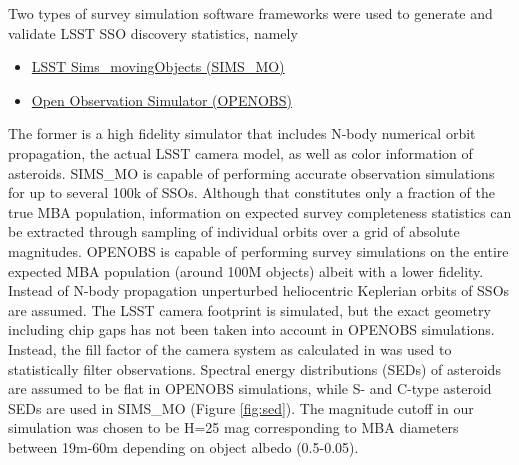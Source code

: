Two types of survey simulation software frameworks were used to generate and validate LSST SSO discovery statistics, namely
\begin{itemize}
\item \href{https://epyc.astro.washington.edu/~lynnej/sims_movingObjects/lsst.sims.movingObjects.html}{LSST Sims\_movingObjects (SIMS\_MO)}
\item \href{https://github.com/eggls6/openobs}{Open Observation Simulator (OPENOBS)}
\end{itemize}
The former is a high fidelity simulator that includes N-body numerical orbit propagation, the actual LSST camera model, as well as color information of asteroids. SIMS\_MO is capable of performing accurate observation simulations for up to several 100k of SSOs. Although that constitutes only a fraction of the true MBA population, information on expected survey completeness statistics can be extracted through sampling of individual orbits over a grid of absolute magnitudes. 
OPENOBS is capable of performing survey simulations on the entire expected MBA population (around 100M objects) albeit with a lower fidelity. Instead of N-body propagation unperturbed heliocentric Keplerian orbits of SSOs are assumed. The LSST camera footprint is simulated, but the exact geometry including chip gaps has not been taken into account in OPENOBS simulations. Instead, the fill factor of the camera system as calculated in \citet{veres2017high} was used to statistically filter observations. Spectral energy distributions (SEDs) of asteroids are assumed to be flat in OPENOBS simulations, while S- and C-type asteroid SEDs are used in SIMS\_MO (Figure \ref{fig:sed}). The magnitude cutoff in our simulation was chosen to be H=25 mag corresponding to MBA diameters between 19m-60m depending on object albedo (0.5-0.05).
